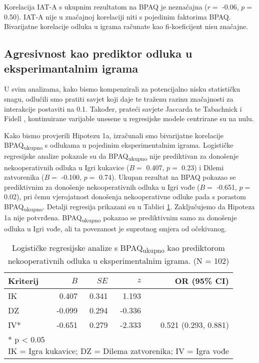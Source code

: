 \documentclass[a4paper, 12pt]{report}
\begin{document}
Korelacija IAT-A s ukupnim rezultatom na
BPAQ je neznačajna ($r =$ -0.06, $p =$ 0.50). IAT-A nije u značajnoj korelaciji
niti s pojedinim faktorima BPAQ.
Bivarijatne korelacije odluka u igrama računate
kao fi-koeficijent nisu značajne.

\subsection{Agresivnost kao prediktor odluka u eksperimantalnim igrama}

U svim analizama, kako bismo kompenzirali za potencijalno nisku statističku
snagu, odlučili smo pratiti savjet koji daje 
\citet{aguinis1995statistical} te traženu razinu značajnosti za interakcije
postaviti na 0.1. Također, prateći savjete Jaccarda
\citeyearpar{jaccard2001interaction} te Tabachnick i Fidell
\citeyearpar{tabachnick2012multi}, kontinuirane varijable unesene u regresijske
modele centrirane su na nulu. 

Kako bismo provjerili Hipotezu 1a, izračunali smo bivarijatne korelacije BPAQ\textsubscript{ukupno}
s odlukama u pojedinim eksperimentalnim igrama. Logističke regresijske analize
pokazale su da BPAQ\textsubscript{ukupno} nije prediktivan za donošenje
nekooperativnih odluka u
Igri kukavice ($B =$ 0.407, $p =$ 0.23) i Dilemi zatvorenika ($B =$ -0.100, $p
=$ 0.74). Ukupan rezultat na BPAQ pokazao se prediktivnim za donošenje
nekooperativnih odluka u Igri vođe ($B =$ -0.651, $p =$ 0.02), pri čemu
vjerojatnost donošenja nekooperativne odluke pada s porastom
BPAQ\textsubscript{ukupno}. Detalji regresija prikazani su u Tablici
\ref{bivargameks}. 
Zaključujemo da Hipoteza 1a nije potvrđena. BPAQ\textsubscript{ukupno} pokazao se prediktivnim
samo za donošenje odluka u Igri vođe, ali ta povezanost je suprotnog smjera od
očekivanog.

\begin{table}[h!]
    \begin{center}
        \caption{\label{bivargameks} Logističke regresijske analize s
            BPAQ\textsubscript{ukupno} kao prediktorom nekooperativnih odluka u
            eksperimentalnim igrama. (N = 102)}
        \hspace*{-0.7cm}\begin{tabular}{lrrrr}
        \toprule
        Kriterij & $B$ & $SE$ & $z$ & OR (95\% CI)\\
        \midrule
        IK & 0.407 & 0.341 & 1.193 &\\
        DZ & -0.099 & 0.294 & -0.336 &\\
        IV* & -0.651 & 0.279 & -2.333 & 0.521 (0.293, 0.881)\\
        \bottomrule
        \multicolumn{5}{l}{
            \parbox{9cm}{\scriptsize \vspace{3pt} 
                * p < 0.05\\
                IK = Igra kukavice; DZ = Dilema zatvorenika; IV = Igra vođe
        }}
    \end{tabular}
\end{center}
\end{table}
\end{document}
